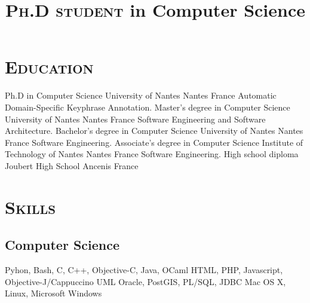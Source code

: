 \documentclass[10pt, a4paper]{moderncv}
\title{\Large{\textsc{Ph.D student}} \large{in Computer Science}}
\begin{document}
  \maketitle

  \section{\textsc{Education}}
            {Ph.D in Computer Science}                        %
            {University of Nantes}                            %
            {Nantes}                                          %
            {France}                                          %
            {Automatic Domain-Specific Keyphrase Annotation.} %
            {Master's degree in Computer Science}
            {University of Nantes}
            {Nantes}
            {France}
            {Software Engineering and Software Architecture.}
            {Bachelor's degree in Computer Science}
            {University of Nantes}
            {Nantes}
            {France}
            {Software Engineering.}
            {Associate's degree in Computer Science}
            {Institute of Technology of Nantes}
            {Nantes}
            {France}
            {Software Engineering.}
            {High school diploma}
            {Joubert High School}
            {Ancenis}
            {France}
            {}

  \section{\textsc{Skills}}
    \subsection{Computer Science}
             {Pyhon, Bash, C, C++, Objective-C, Java, OCaml}
             {HTML, PHP, Javascript, Objective-J/Cappuccino}
             {UML}
             {Oracle, PostGIS, PL/SQL, JDBC}
             {Mac OS X, Linux, Microsoft Windows}
\end{document}
